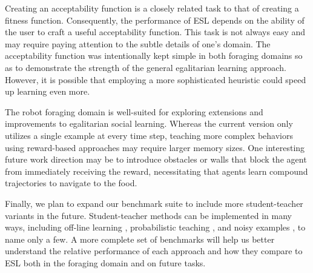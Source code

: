 \documentclass{sig-alternate}
\begin{document}
Creating an acceptability function is a closely related task to that of creating a fitness function. Consequently, the performance of ESL depends on the ability of the user to craft a useful acceptability function. This task is not always easy and may require paying attention to the subtle details of one's domain. The acceptability function was intentionally kept simple in both foraging domains so as to demonstrate the strength of the general egalitarian learning approach. However, it is possible that employing a more sophisticated heuristic could speed up learning even more.

The robot foraging domain is well-suited for exploring extensions and improvements to egalitarian social learning. Whereas the current version only utilizes a single example at every time step, teaching more complex behaviors using reward-based approaches may require larger memory sizes. One interesting future work direction may be to introduce obstacles or walls that block the agent from immediately receiving the reward, necessitating that agents learn compound trajectories to navigate to the food.

Finally, we plan to expand our benchmark suite to include more student-teacher variants in the future. Student-teacher methods can be implemented in many ways, including off-line learning \cite{acerbi2007social}, probabilistic teaching \cite{haasdijk2008social}, and noisy examples \cite{denaro1996cultural}, to name only a few. A more complete set of benchmarks will help us better understand the relative performance of each approach and how they compare to ESL both in the foraging domain and on future tasks.

\end{document}
